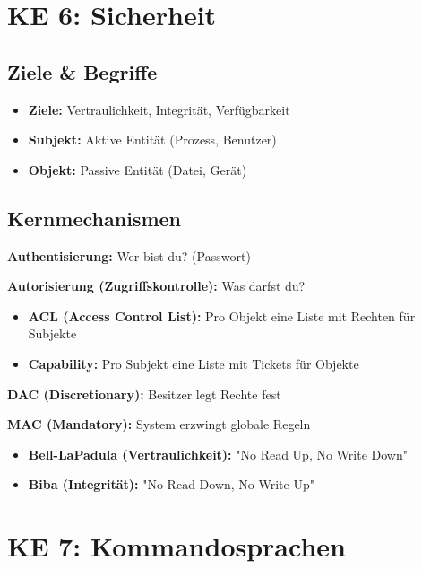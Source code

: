 \documentclass[9pt,a4paper]{extarticle}
\begin{document}
\begin{multicols*}{2}
\section{KE 6: Sicherheit}

\subsection{Ziele \& Begriffe}
\begin{itemize}
\item \textbf{Ziele:} Vertraulichkeit, Integrität, Verfügbarkeit
\item \textbf{Subjekt:} Aktive Entität (Prozess, Benutzer)
\item \textbf{Objekt:} Passive Entität (Datei, Gerät)
\end{itemize}

\subsection{Kernmechanismen}
\textbf{Authentisierung:} Wer bist du? (Passwort)

\textbf{Autorisierung (Zugriffskontrolle):} Was darfst du?
\begin{itemize}
\item \textbf{ACL (Access Control List):} Pro Objekt eine Liste mit Rechten für Subjekte
\item \textbf{Capability:} Pro Subjekt eine Liste mit Tickets für Objekte
\end{itemize}

\textbf{DAC (Discretionary):} Besitzer legt Rechte fest

\textbf{MAC (Mandatory):} System erzwingt globale Regeln
\begin{itemize}
\item \textbf{Bell-LaPadula (Vertraulichkeit):} "No Read Up, No Write Down"
\item \textbf{Biba (Integrität):} "No Read Down, No Write Up"
\end{itemize}

\section{KE 7: Kommandosprachen}


\end{multicols*}
\end{document}
